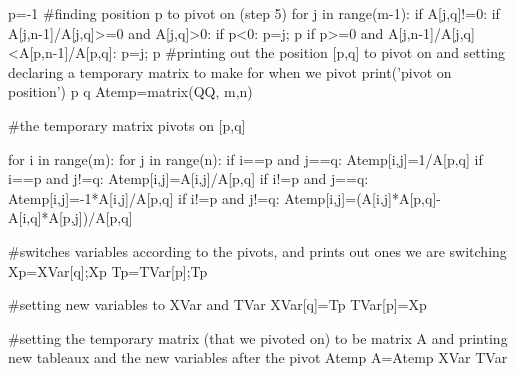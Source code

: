 \documentclass{ximera}
\begin{document}
\begin{sageCell}
        
            p=-1
            #finding position p to pivot on (step 5)
            for j in range(m-1):
                if A[j,q]!=0:
                    if A[j,n-1]/A[j,q]>=0 and A[j,q]>0:
                        if p<0:
                            p=j; p
                        if p>=0 and A[j,n-1]/A[j,q]<A[p,n-1]/A[p,q]:
                            p=j; p
            #printing out the position [p,q] to pivot on and setting declaring a temporary matrix to make for when we pivot
            print('pivot on position')
            p
            q
        Atemp=matrix(QQ, m,n)

            #the temporary matrix pivots on [p,q] 
        
        for i in range(m):
            for j in range(n):
                if i==p and j==q:
                    Atemp[i,j]=1/A[p,q]
                if i==p and j!=q:
                    Atemp[i,j]=A[i,j]/A[p,q]
                if i!=p and j==q:
                    Atemp[i,j]=-1*A[i,j]/A[p,q]
                if i!=p and j!=q: 
                    Atemp[i,j]=(A[i,j]*A[p,q]-A[i,q]*A[p,j])/A[p,q]

            #switches variables according to the pivots, and prints out ones we are switching
        Xp=XVar[q];Xp
        Tp=TVar[p];Tp

            #setting new variables to XVar and TVar
        XVar[q]=Tp
        TVar[p]=Xp
            
        #setting the temporary matrix (that we pivoted on) to be matrix A and printing new tableaux and the new variables after the pivot
        Atemp
        A=Atemp
        XVar
        TVar
\end{sageCell}
\end{document}
